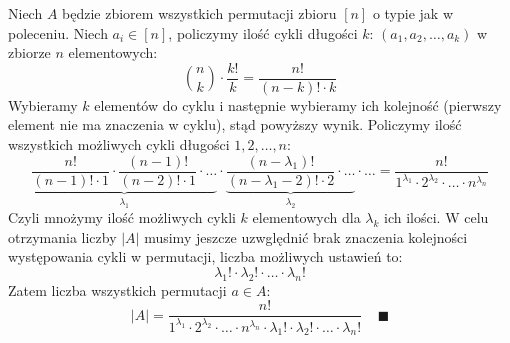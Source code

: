 \documentclass{mwart}
\begin{document}
\begin{mdframed}
    Niech $A$ będzie zbiorem wszystkich permutacji zbioru $[n]$ o typie jak w poleceniu.
    Niech $a_i \in [n]$, policzymy ilość cykli długości $k$: $(a_1,a_2,\ldots,a_k)$ w zbiorze $n$ elementowych:
    \[\binom{n}{k} \cdot \frac{k!}{k} = \frac{n!}{(n-k)! \cdot k}\]
    Wybieramy $k$ elementów do cyklu i następnie wybieramy ich kolejność (pierwszy element 
    nie ma znaczenia w cyklu), stąd powyższy wynik.
    \newline \newline
    Policzymy ilość wszystkich możliwych cykli długości $1,2,\ldots,n$:
    \[\underbrace{\frac{n!}{(n-1)! \cdot 1} \cdot \frac{(n-1)!}{(n-2)! \cdot 1} \cdot \ldots}_{\lambda_1} \cdot 
    \underbrace{\frac{(n-\lambda_1)!}{(n-\lambda_1-2)! \cdot 2} \cdot \ldots}_{\lambda_2} \cdot \ldots = 
    \frac{n!}{1^{\lambda_1} \cdot 2^{\lambda_2} \cdot \ldots \cdot n^{\lambda_n}} \]
    Czyli mnożymy ilość możliwych cykli $k$ elementowych dla $\lambda_k$ ich ilości.
    \newline \newline
    W celu otrzymania liczby $|A|$ musimy jeszcze uzwględnić brak znaczenia kolejności
    występowania cykli w permutacji, liczba możliwych ustawień to:
    \[{\lambda_1}! \cdot {\lambda_2}! \cdot \ldots \cdot {\lambda_n}!\]
    Zatem liczba wszystkich permutacji $a \in A$:
    \[|A| = \frac{n!}{1^{\lambda_1} \cdot 2^{\lambda_2} \cdot \ldots \cdot n^{\lambda_n}
    \cdot {\lambda_1}! \cdot {\lambda_2}! \cdot \ldots \cdot {\lambda_n}!} \; \; \; \; \blacksquare\]
\end{mdframed}
\end{document}
